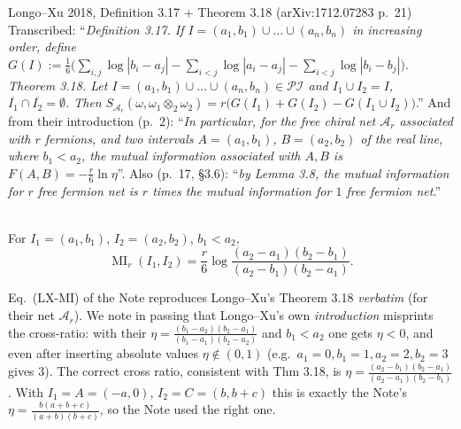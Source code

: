 \documentclass[11pt]{article}
\newcommand{\MI}{\operatorname{MI}}
\begin{document}
\begin{citedbox}{Longo--Xu 2018, Definition 3.17 + Theorem 3.18 (arXiv:1712.07283 p.~21)}
Transcribed: ``\emph{Definition 3.17. If $I=(a_1,b_1)\cup\dots\cup(a_n,b_n)$ in
increasing order, define}
$G(I):=\frac16\bigl(\sum_{i,j}\log|b_i-a_j|-\sum_{i<j}\log|a_i-a_j|
-\sum_{i<j}\log|b_i-b_j|\bigr)$.
\emph{Theorem 3.18. Let $I=(a_1,b_1)\cup\dots\cup(a_n,b_n)\in\mathcal{PI}$ and
$I_1\cup I_2=I$, $\overline{I_1}\cap\overline{I_2}=\emptyset$. Then}
$S_{\mathcal A_r}(\omega,\omega_1\otimes_2\omega_2)=r\bigl(G(I_1)+G(I_2)-G(I_1\cup I_2)\bigr)$.''
And from their introduction (p.~2): ``\emph{In particular, for the free chiral
net $\mathcal A_r$ associated with $r$ fermions, and two intervals
$A=(a_1,b_1)$, $B=(a_2,b_2)$ of the real line, where $b_1<a_2$, the mutual
information associated with $A,B$ is $F(A,B)=-\frac r6\ln\eta$}''.
Also (p.~17, §3.6): ``\emph{by Lemma 3.8, the mutual information for $r$ free
fermion net is $r$ times the mutual information for $1$ free fermion net}.''\\[2pt]
\\
\end{citedbox}

\begin{lemma}\label{lem:lxmi}
For $I_1=(a_1,b_1)$, $I_2=(a_2,b_2)$, $b_1<a_2$,
\[
 \MI_r(I_1,I_2)=\frac r6\log\frac{(a_2-a_1)(b_2-b_1)}{(a_2-b_1)(b_2-a_1)} .
\]
\end{lemma}
\lstep{1}{3}{$\MI_r=r[G(I_1)+G(I_2)-G(I_1\cup I_2)]
 =\frac r6\log\frac{(a_2-a_1)(b_2-b_1)}{(a_2-b_1)(b_2-a_1)}$.}
\begin{verdictok}
Eq.~(LX-MI) of the Note reproduces Longo--Xu's Theorem 3.18 \emph{verbatim} (for
their net $\mathcal A_r$). We note in passing that Longo--Xu's own
\emph{introduction} misprints the cross-ratio: with their $\eta=\frac{(b_1-a_2)(b_2-a_1)}
{(b_1-a_1)(b_2-a_2)}$ and $b_1<a_2$ one gets $\eta<0$, and even after inserting
absolute values $\eta\notin(0,1)$ (e.g.\ $a_1=0,b_1=1,a_2=2,b_2=3$ gives $3$).
The correct cross ratio, consistent with Thm 3.18, is
$\eta=\frac{(a_2-b_1)(b_2-a_1)}{(a_2-a_1)(b_2-b_1)}$. With $I_1=A=(-a,0)$,
$I_2=C=(b,b+c)$ this is exactly the Note's
$\eta=\frac{b(a+b+c)}{(a+b)(b+c)}$, so the Note used the right one.
\end{verdictok}
\end{document}

